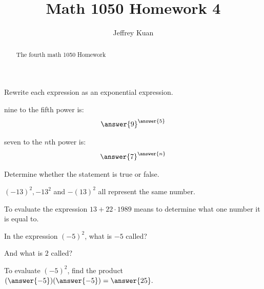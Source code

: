 \documentclass{ximera}
\author{Jeffrey Kuan}
\title{Math 1050 Homework 4}
\begin{document}
\begin{abstract}
   The fourth math 1050 Homework 
\end{abstract}

\maketitle

\begin{problem}
Rewrite each expression as an exponential expression. 

nine to the fifth power is:
\[
\answer{9}^{\answer{5}}
\]

seven to the $n$th power is:
\[
\answer{7}^{\answer{n}}
\]

\end{problem}

\begin{problem}
   Determine whether the statement is true or false.

$(-13)^2, -13^2$ and $-(13)^2$ all represent the same number. 

\begin{multipleChoice}
\end{multipleChoice}

To evaluate the expression \( 13 + 22\cdot 1989\) means to determine what one number it is equal to.
\begin{multipleChoice}
\end{multipleChoice}

\end{problem}

\begin{problem}
In the expression \( (-5)^2 \), what is $-5$ called?

\begin{multipleChoice}
\end{multipleChoice}

And what is $2$ called?

\begin{multipleChoice}
\end{multipleChoice}


To evaluate \( (-5)^2 \), find the product $ (\answer{-5})(\answer{-5}) = \answer{25}.$
\end{problem}
\end{document}
